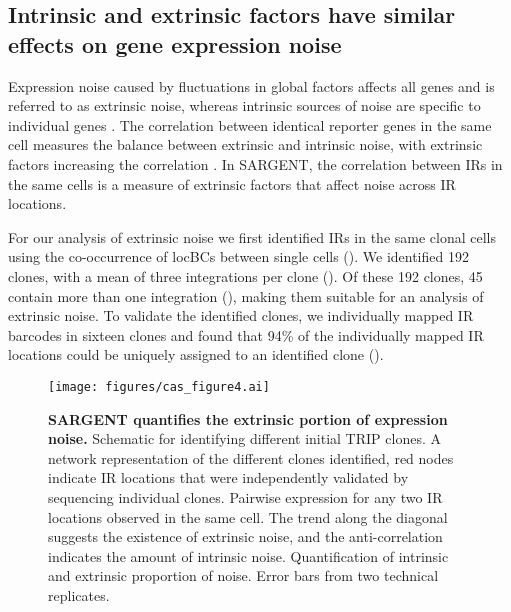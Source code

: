 \subsection{Intrinsic and extrinsic factors have similar effects on gene expression noise}

Expression noise caused by fluctuations in global factors affects all genes and is referred to as extrinsic noise, whereas intrinsic sources of noise are specific to individual genes \cite{deyss_arkinap:OrthogonalControl2015, stewart-ornsteinj_el-samadh:CellularNoise2012, sancheza_goldingi:GeneticDeterminants2013, raserjm_osheaek:ControlStochasticity2004, zopfcj_maheshrin:CellCycleDependence2013, vallaniaflm_mitrard:OriginConsequences2014}. The correlation between identical reporter genes in the same cell measures the balance between extrinsic and intrinsic noise, with extrinsic factors increasing the correlation \cite{elowitzmb_swainps:StochasticGene2002}. In SARGENT, the correlation between IRs in the same cells is a measure of extrinsic factors that affect noise across IR locations. 

For our analysis of extrinsic noise we first identified IRs in the same clonal cells using the co-occurrence of locBCs between single cells (). We identified 192 clones, with a mean of three integrations per clone (). Of these 192 clones, 45 contain more than one integration (), making them suitable for an analysis of extrinsic noise. To validate the identified clones, we individually mapped IR barcodes in sixteen clones and found that 94\% of the individually mapped IR locations could be uniquely assigned to an identified clone (). 

\begin{figure}[tbp]  
    \centering
    \texttt{[image: figures/cas\_figure4.ai]}
    \caption[SARGENT quantifies the extrinsic portion of expression noise.]{%
        \textbf{SARGENT quantifies the extrinsic portion of expression noise.}
        Schematic for identifying different initial TRIP clones.
        A network representation of the different clones identified, red nodes indicate IR locations that were independently validated by sequencing individual clones.
        Pairwise expression for any two IR locations observed in the same cell. The trend along the diagonal suggests the existence of extrinsic noise, and the anti-correlation indicates the amount of intrinsic noise.
        Quantification of intrinsic and extrinsic proportion of noise. Error bars from two technical replicates. 
    }
    \label{fig:cas_figure4}
\end{figure}

